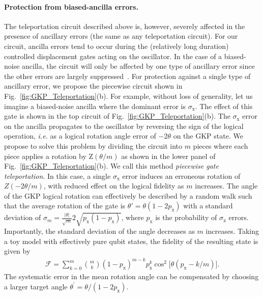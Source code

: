 \documentclass[aps,prx,showpacs,notitlepage,twocolumn,superscriptaddress,nofootinbib,preprintnumbers,floatfix,10pt, longbibliography]{revtex4-2}
\begin{document}
\paragraph{Protection from biased-ancilla errors.} The teleportation circuit described above is, however, severely affected in the presence of ancillary errors (the same as any teleportation circuit). For our circuit, ancilla errors tend to occur during the (relatively long duration) controlled displacement gates acting on the oscillator. In the case of a biased-noise ancilla, the circuit will only be affected by one type of ancillary error since the other errors are largely suppressed~\cite{grimm2020stabilization,ding2024quantum}. For protection against a single type of ancillary error, we propose the piecewise circuit shown in Fig.~\ref{fig:GKP_Teleportation}(b). For example, without loss of generality, let us imagine a biased-noise ancilla where the dominant error is $\sigma_\mathrm{x}$. The effect of this gate is shown in the top circuit of Fig.~\ref{fig:GKP_Teleportation}(b). The $\sigma_\mathrm{x}$ error on the ancilla propagates to the oscillator by reversing the sign of the logical operation, \emph{i.e.} as a logical rotation angle error of $-2\theta$ on the GKP state. We propose to solve this problem by dividing the circuit into $m$ pieces where each piece applies a rotation by $\mathrm{Z}(\theta/m)$ as shown in the lower panel of Fig.~\ref{fig:GKP_Teleportation}(b). We call this method \emph{piecewise gate teleportation}. In this case, a single $\sigma_\mathrm{x}$ error induces an erroneous rotation of $Z(-2\theta/m)$, with reduced effect on the logical fidelity as $m$ increases. The angle of the GKP logical rotation can effectively be described by a random walk such that the average rotation of the gate is $\theta' =\theta(1-2p_\mathrm{x})$ with a standard deviation of $\sigma_m =\frac{|\theta|}{\sqrt{m}}2\sqrt{p_\mathrm{x}(1-p_\mathrm{x})}$, where $p_\mathrm{x}$ is the probability of $\sigma_\textrm{x}$ errors. Importantly, the standard deviation of the angle decreases as $m$ increases.  
Taking a toy model with effectively pure qubit states, the fidelity of the resulting state is given by
\begin{align}
  \mathcal{F}=\sum_{k=0}^m {m\choose k} (1-p_\mathrm{x})^{m-k}p_\mathrm{x}^k \cos^2{\Big[\theta(p_\mathrm{x}-k/m)\Big]}.\label{eq:PCGT}
\end{align}
The systematic error in the mean rotation angle can be compensated by choosing a larger target angle $\theta^\prime = \theta/(1-2p_\mathrm{x})$.
\end{document}

